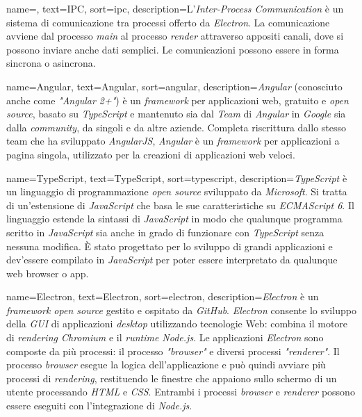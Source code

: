  {
    name=,
    text=IPC,
    sort=ipc,
    description={L'\emph{Inter-Process Communication} è un sistema di comunicazione tra processi offerto da \emph{Electron}. La comunicazione avviene dal processo \emph{main} al processo \emph{render} attraverso appositi canali, dove si possono inviare anche dati semplici. Le comunicazioni possono essere in forma sincrona o asincrona.}
}

 {
    name=Angular,
    text=Angular,
    sort=angular,
    description={\emph{Angular} (conosciuto anche come \emph{"Angular 2+"}) è un \emph{framework} per applicazioni web, gratuito e \emph{open source}, basato su \emph{TypeScript} e mantenuto sia dal \emph{Team} di \emph{Angular} in \emph{Google} sia dalla \emph{community}, da singoli e da altre aziende. Completa riscrittura dallo stesso team che ha sviluppato \emph{AngularJS}, \emph{Angular} è un \emph{framework} per applicazioni a pagina singola, utilizzato per la creazioni di applicazioni web veloci.}
}

 {
    name=TypeScript,
    text=TypeScript,
    sort=typescript,
    description={\emph{TypeScript} è un linguaggio di programmazione \emph{open source} sviluppato da \emph{Microsoft}. Si tratta di un'estensione di \emph{JavaScript} che basa le sue caratteristiche su \emph{ECMAScript 6}. Il linguaggio estende la sintassi di \emph{JavaScript} in modo che qualunque programma scritto in \emph{JavaScript} sia anche in grado di funzionare con \emph{TypeScript} senza nessuna modifica. È stato progettato per lo sviluppo di grandi applicazioni e dev'essere compilato in \emph{JavaScript} per poter essere interpretato da qualunque web browser o app.}
}

 {
    name=Electron,
    text=Electron,
    sort=electron,
    description={\emph{Electron} è un \emph{framework open source} gestito e ospitato da \emph{GitHub}. \emph{Electron} consente lo sviluppo della \emph{GUI} di applicazioni \emph{desktop} utilizzando tecnologie Web: combina il motore di \emph{rendering Chromium} e il \emph{runtime Node.js}. Le applicazioni \emph{Electron} sono composte da più processi: il processo \emph{"browser"} e diversi processi \emph{"renderer"}. Il processo \emph{browser} esegue la logica dell'applicazione e può quindi avviare più processi di \emph{rendering}, restituendo le finestre che appaiono sullo schermo di un utente processando \emph{HTML} e \emph{CSS}. Entrambi i processi \emph{browser} e \emph{renderer} possono essere eseguiti con l'integrazione di \emph{Node.js}.}
}

